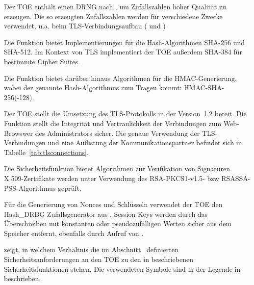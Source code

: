 
Der TOE enthält einen DRNG nach , um Zufallszahlen
hoher Qualität zu erzeugen. Die so erzeugten Zufallszahlen werden für
verschiedene Zwecke verwendet, u.a. beim TLS-Verbindungsaufbau
( und )



Die Funktion bietet Implementierungen für die Hash-Algorithmen
SHA-256 und SHA-512. Im Kontext von TLS implementiert der TOE außerdem
SHA-384 für bestimmte Cipher Suites.



Die Funktion bietet darüber hinaus Algorithmen für die HMAC-Generierung, wobei
der genannte Hash-Algorithmus zum Tragen kommt: HMAC-SHA-256(-128).



Der TOE stellt die Umsetzung des TLS-Protokolls in der Version~1.2 bereit. Die
Funktion stellt die Integrität und Vertraulichkeit der Verbindungen zum
Web-Browswer des Administrators sicher. Die genaue Verwendung der
TLS-Verbindungen und eine Auflistung der Kommunikationspartner befindet sich in
Tabelle~\vref{tab:tlsconnections}.


Die Sicherheitsfunktion  bietet Algorithmen
zur Verifikation von Signaturen. X.509-Zertifikate werden unter Verwendung des
RSA-PKCS1-v1.5- bzw RSASSA-PSS-Algorithmus geprüft.


Für die Generierung von Nonces und Schlüsseln verwendet der TOE den Hash\_DRBG
Zufallsgenerator aus . Session Keys werden
durch das Überschreiben mit konstanten oder pseudozufälligen Werten sicher aus
dem Speicher entfernt, ebenfalls durch Aufruf von
.


\pagebreak


 zeigt, in welchem Verhältnis die im
Abschnitt~ definierten Sicherheitsanforderungen an den
TOE zu den in  beschriebenen Sicherheitsfunktionen
stehen. Die verwendeten Symbole sind in der Legende in
 beschrieben.




